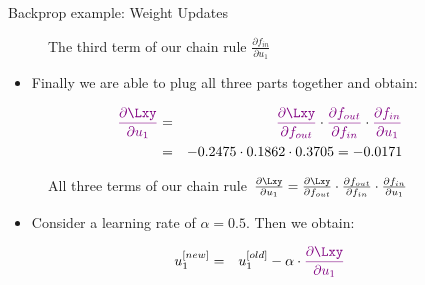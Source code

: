 \begin{vbframe}{Backprop example: Weight Updates}
\begin{figure}
        \caption{The third term of our chain rule $\frac{\partial f_{in}}{\partial u_1}$}
    \end{figure}
\framebreak
  \begin{itemize}
    \item Finally we are able to plug all three parts together and obtain:
  \end{itemize}
  \begin{eqnarray*}
    \textcolor{violet}{\frac{\partial \Lxy}{\partial u_1}} &=& \textcolor{violet}{\frac{\partial \Lxy}{\partial f_{out}}} \cdot \textcolor{violet}{\frac{\partial f_{out}}{\partial f_{in}}} \cdot \textcolor{violet}{\frac{\partial f_{in}}{\partial u_1}} \\
                                        &=& \num[round-mode=places,round-precision=4]{-0.2474531} \cdot \num[round-mode=places,round-precision=4]{0.1862201} \cdot \num[round-mode=places,round-precision=4]{0.3705169} = \num[round-mode=places,round-precision=4]{-0.01707369}
  \end{eqnarray*}
    \begin{figure}
      \centering
        \caption{All three terms of our chain rule $\frac{\partial \Lxy}{\partial u_1} = \frac{\partial \Lxy}{\partial f_{out}} \cdot \frac{\partial f_{out}}{\partial f_{in}} \cdot \frac{\partial f_{in}}{\partial u_1}$}
    \end{figure}
\framebreak
  \begin{itemize}
    \item Consider a learning rate of $\alpha = 0.5$. Then we obtain:
  \end{itemize}
    \begin{eqnarray*}
      u_1^{[new]} &=& u_1^{[old]} - \alpha \cdot \textcolor{violet}{\frac{\partial \Lxy}{\partial u_1}} \\

\end{eqnarray*}
\end{vbframe}
